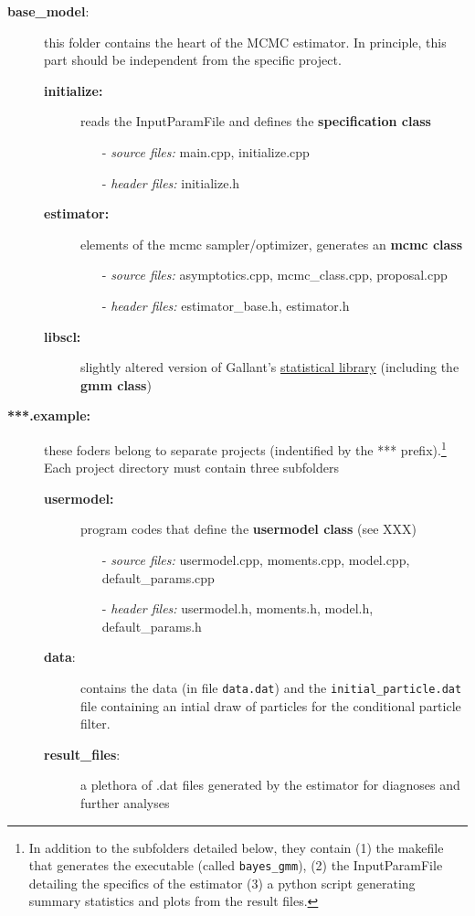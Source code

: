 \documentclass[11pt, letterpaper, notitlepage]{article}
\begin{document}
\begin{description}
\item[\textbf{base\_model}:] this folder contains the heart of the MCMC estimator. In principle, this part should be independent from the specific project.
\begin{description}
\item[\textbf{initialize:}] reads the InputParamFile and defines the \textbf{specification class}
\begin{itemize}
\item[-] \emph{source files:} main.cpp, initialize.cpp 
\item[-] \emph{header files:} initialize.h 
\end{itemize}
\item[\textbf{estimator:}] elements of the mcmc sampler/optimizer, generates an \textbf{mcmc class}
\begin{itemize}
\item[-] \emph{source files:} asymptotics.cpp, mcmc\_class.cpp, proposal.cpp 
\item[-] \emph{header files:} estimator\_base.h, estimator.h 
\end{itemize}
\item[\textbf{libscl:}] slightly altered version of Gallant's \href{https://www.aronaldg.org/webfiles/libscl}{statistical library} (including the \textbf{gmm class}) 
\end{description}
\item[\textbf{***.example:}] these foders belong to separate projects (indentified by the *** prefix).\footnote{In addition to the subfolders detailed below, they contain (1) the makefile that generates the executable (called \texttt{bayes\_gmm}), (2) the InputParamFile detailing the specifics of the estimator (3) a python script generating summary statistics and plots from the result files.} Each project directory must contain three subfolders
\begin{description}
\item[\textbf{usermodel:}] program codes that define the \textbf{usermodel class} (see XXX)
\begin{itemize}
\item[-] \emph{source files:} usermodel.cpp, moments.cpp, model.cpp, default\_params.cpp 
\item[-] \emph{header files:} usermodel.h, moments.h, model.h, default\_params.h
\end{itemize}
\item[\textbf{data}:] contains the data (in file \texttt{data.dat}) and the \texttt{initial\_particle.dat} file containing an intial draw of particles for the conditional particle filter. 
\item[\textbf{result\_files}:] a plethora of .dat files generated by the estimator for diagnoses and further analyses
\end{description}
\end{description}
\end{document}
